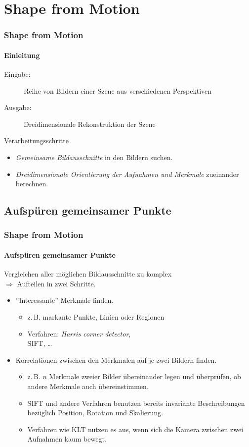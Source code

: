 \documentclass{beamer}
\begin{document}
\section{Shape from Motion}
\begin{frame}
	\frametitle{Shape from Motion}
	\framesubtitle{Einleitung}

	\begin{description}
		\item[Eingabe:] Reihe von Bildern einer Szene aus verschiedenen Perspektiven
		\item[Ausgabe:] Dreidimensionale Rekonstruktion der Szene
	\end{description}

	\begin{block}{Verarbeitungsschritte}
		\begin{itemize}
			\item \emph{Gemeinsame Bildausschnitte} in den Bildern suchen.
			\item \emph{Dreidimensionale Orientierung der Aufnahmen und Merkmale} zueinander berechnen.
		\end{itemize}
	\end{block}
\end{frame}


\subsection{Aufspüren gemeinsamer Punkte}
\begin{frame}
	\frametitle{Shape from Motion}
	\framesubtitle{Aufspüren gemeinsamer Punkte}
	
	Vergleichen aller möglichen Bildausschnitte zu komplex \pause \\
	$\Rightarrow$ Aufteilen in zwei Schritte.
	
	\begin{itemize}
		\item ''Interessante'' Merkmale finden.
			\begin{itemize}
				\item<3-> z.\,B. markante Punkte, Linien oder Regionen
				\item<3-> Verfahren: \emph{Harris corner detector}, \\
				\acf{SIFT}, \dots
			\end{itemize}
		\item Korrelationen zwischen den Merkmalen auf je zwei Bildern finden.
			\begin{itemize}
				\item<4-> z.\,B. $n$ Merkmale zweier Bilder übereinander legen und überprüfen, ob andere Merkmale auch übereinstimmen.
				\item<4-> \ac{SIFT} und andere Verfahren benutzen bereits invariante Beschreibungen bezüglich Position, Rotation und Skalierung.
				\item<4-> Verfahren wie \ac{KLT} nutzen es aus, wenn sich die Kamera zwischen zwei Aufnahmen kaum bewegt.
			\end{itemize}
	\end{itemize}
\end{frame}
\end{document}
